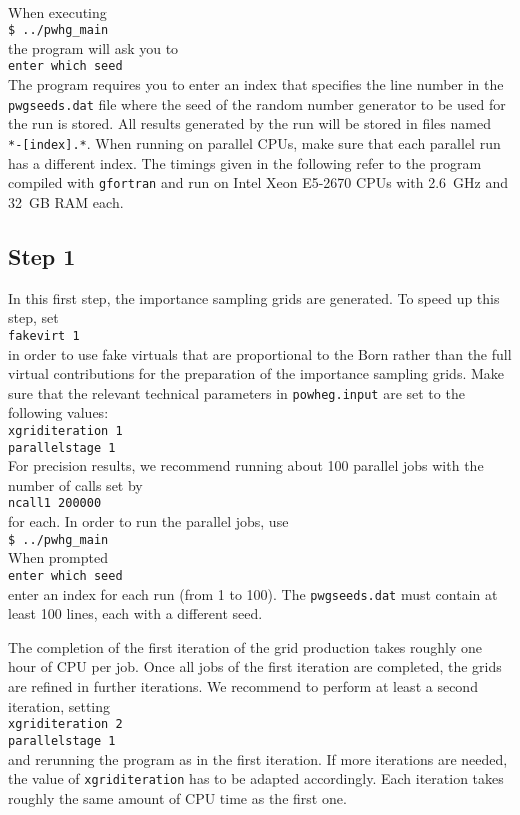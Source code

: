 \documentclass[a4paper,11pt]{article}
\begin{document}
\\[2ex]
When executing
\\[2ex]
{\tt \$ ../pwhg\_main}
\\[2ex]
the program will ask you to
\\[2ex]
{\tt enter which seed}
\\[2ex]
The program requires you to enter an index that specifies the line
number in the {\tt pwgseeds.dat} file where the seed of the random
number generator to be used for the run is stored. All results
generated by the run will be stored in files named {\tt
  *-[index].*}. When running on parallel CPUs, make sure that each
parallel run has a different index.
The timings given in the following refer to the program compiled with
{\tt gfortran} and run on Intel Xeon E5-2670 CPUs with 2.6~GHz and 32~GB RAM each.


\subsection*{Step 1}

In this first step, the importance sampling grids are generated. To speed up this step, set 
\\[2ex] 
{\tt fakevirt 1}
\\[2ex] 
in order to use fake virtuals that are proportional to the Born rather than the full virtual contributions for the preparation of the importance sampling grids. 
Make sure that the relevant technical parameters in {\tt powheg.input}
are set to the following values:
\\[2ex]
{\tt xgriditeration 1}
\\
{\tt parallelstage 1}
\\[2ex]
For precision results, we recommend running about 100 parallel jobs with the number of calls set by
\\[2ex] 
{\tt ncall1 200000}
\\[2ex] 
for each. 
%
In order to run the parallel jobs, use
\\[2ex]
{\tt \$ ../pwhg\_main}
\\[2ex]
When prompted
\\[2ex]
{\tt enter which seed}
\\[2ex]
enter an index for each run (from 1 to 100). The {\tt pwgseeds.dat}
must contain at least 100 lines, each with a different seed.

The completion of the first iteration of the grid production takes
roughly one hour of CPU per job.
Once all jobs of the first iteration are completed,
the grids are refined in further iterations.
We recommend to perform at least a second iteration, setting 
\\[2ex]
{\tt xgriditeration   2}
\\
{\tt parallelstage     1}
\\[2ex]
%
and rerunning the program as in the first iteration.
If more iterations are needed, the value of {\tt xgriditeration}
has to be adapted accordingly.
Each iteration takes roughly the same amount of CPU time as the first one. 
 
\end{document}
